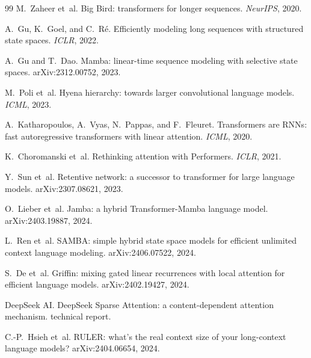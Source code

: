 \begin{thebibliography}{99}
M.~Zaheer et~al.
\newblock Big Bird: transformers for longer sequences.
\newblock \emph{NeurIPS}, 2020.

A.~Gu, K.~Goel, and C.~R\'e.
\newblock Efficiently modeling long sequences with structured state spaces.
\newblock \emph{ICLR}, 2022.

A.~Gu and T.~Dao.
\newblock Mamba: linear-time sequence modeling with selective state spaces.
\newblock arXiv:2312.00752, 2023.

M.~Poli et~al.
\newblock Hyena hierarchy: towards larger convolutional language models.
\newblock \emph{ICML}, 2023.

A.~Katharopoulos, A.~Vyas, N.~Pappas, and F.~Fleuret.
\newblock Transformers are RNNs: fast autoregressive transformers with linear
  attention.
\newblock \emph{ICML}, 2020.

K.~Choromanski et~al.
\newblock Rethinking attention with Performers.
\newblock \emph{ICLR}, 2021.

Y.~Sun et~al.
\newblock Retentive network: a successor to transformer for large language
  models.
\newblock arXiv:2307.08621, 2023.

O.~Lieber et~al.
\newblock Jamba: a hybrid Transformer-Mamba language model.
\newblock arXiv:2403.19887, 2024.

L.~Ren et~al.
\newblock SAMBA: simple hybrid state space models for efficient unlimited
  context language modeling.
\newblock arXiv:2406.07522, 2024.

S.~De et~al.
\newblock Griffin: mixing gated linear recurrences with local attention for
  efficient language models.
\newblock arXiv:2402.19427, 2024.

DeepSeek AI.
\newblock DeepSeek Sparse Attention: a content-dependent attention mechanism.
 technical report.

C.-P.~Hsieh et~al.
\newblock RULER: what's the real context size of your long-context language
  models?
\newblock arXiv:2404.06654, 2024.


\end{thebibliography}
